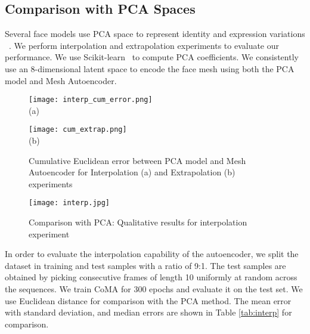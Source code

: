 \subsection{Comparison with PCA Spaces}
\label{sec:comparison_pca}
Several face models use PCA space to represent identity and expression variations ~\cite{Tewari2017,FLAME2017,Amberg2008,Breidt2011,Yang2011}. We perform interpolation and extrapolation experiments to evaluate our performance. We use Scikit-learn~\cite{scikit-learn} to compute PCA coefficients. We consistently use an 8-dimensional latent space to encode the face mesh using both the PCA model and Mesh Autoencoder.

\begin{figure}[t]
  \begin{minipage}[b]{0.5\textwidth}
    \begin{center}
    \texttt{[image: interp\_cum\_error.png]} \\
    (a)
    \end{center}
\end{minipage}
 \hfil
  \begin{minipage}[b]{0.5\textwidth}
    \begin{center}
    \texttt{[image: cum\_extrap.png]} \\
    (b)
	\end{center}
\end{minipage}
\caption{Cumulative Euclidean error between PCA model and Mesh Autoencoder for Interpolation (a) and Extrapolation (b) experiments}
    \label{fig:cum_error1}
\end{figure}


\begin{figure}[t]
\begin{center}
\texttt{[image: interp.jpg]}
\end{center}
\vspace{-4mm}
\caption{Comparison with PCA: Qualitative results for interpolation experiment}
\label{fig:interp}
\end{figure}

In order to evaluate the interpolation capability of the autoencoder, we split the dataset in training and test samples with a ratio of 9:1. The test samples are obtained by picking consecutive frames of length 10  uniformly at random across the sequences. We train CoMA for 300 epochs and evaluate it on the test set. We use Euclidean distance for comparison with the PCA method. The mean error with standard deviation, and median errors are shown in Table \ref{tab:interp} for comparison.


